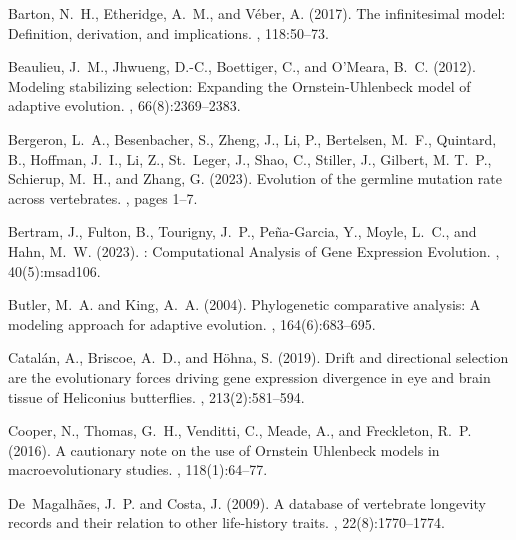 \documentclass{article}
\begin{document}
%
\begin{thebibliography}{}

Barton, N.~H., Etheridge, A.~M., and V{\'e}ber, A. (2017).
\newblock The infinitesimal model: {{Definition}}, derivation, and
  implications.
, 118:50--73.

Beaulieu, J.~M., Jhwueng, D.-C., Boettiger, C., and O'Meara, B.~C. (2012).
\newblock Modeling stabilizing selection: Expanding the {{Ornstein-Uhlenbeck}}
  model of adaptive evolution.
, 66(8):2369--2383.

Bergeron, L.~A., Besenbacher, S., Zheng, J., Li, P., Bertelsen, M.~F.,
  Quintard, B., Hoffman, J.~I., Li, Z., St.~Leger, J., Shao, C., Stiller, J.,
  Gilbert, M. T.~P., Schierup, M.~H., and Zhang, G. (2023).
\newblock Evolution of the germline mutation rate across vertebrates.
, pages 1--7.

Bertram, J., Fulton, B., Tourigny, J.~P., {Pe{\~n}a-Garcia}, Y., Moyle, L.~C.,
  and Hahn, M.~W. (2023).
: {{Computational Analysis}} of {{Gene Expression
  Evolution}}.
, 40(5):msad106.

Butler, M.~A. and King, A.~A. (2004).
\newblock Phylogenetic comparative analysis: A modeling approach for adaptive
  evolution.
, 164(6):683--695.

Catal{\'a}n, A., Briscoe, A.~D., and H{\"o}hna, S. (2019).
\newblock Drift and directional selection are the evolutionary forces driving
  gene expression divergence in eye and brain tissue of {{Heliconius}}
  butterflies.
, 213(2):581--594.

Cooper, N., Thomas, G.~H., Venditti, C., Meade, A., and Freckleton, R.~P.
  (2016).
\newblock A cautionary note on the use of {{Ornstein Uhlenbeck}} models in
  macroevolutionary studies.
, 118(1):64--77.

De~Magalh{\~a}es, J.~P. and Costa, J. (2009).
\newblock A database of vertebrate longevity records and their relation to
  other life-history traits.
, 22(8):1770--1774.


\end{thebibliography}
\end{document}
